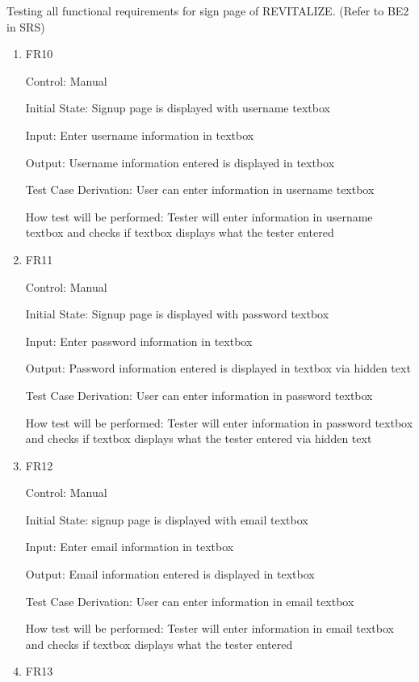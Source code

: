 \documentclass[12pt, titlepage]{article}
\begin{document}
Testing all functional requirements for sign page of REVITALIZE. (Refer to BE2 in SRS)

\begin{enumerate}

\item{FR10\\}

Control: Manual
					
Initial State: Signup page is displayed with username textbox
					
Input: Enter username information in textbox
					
Output: Username information entered is displayed in textbox

Test Case Derivation: User can enter information in username textbox

How test will be performed: Tester will enter information in username textbox and checks if textbox displays what the tester entered
					
\item{FR11\\}

Control: Manual
					
Initial State: Signup page is displayed with password textbox
					
Input: Enter password information in textbox
					
Output: Password information entered is displayed in textbox via hidden text

Test Case Derivation: User can enter information in password textbox

How test will be performed: Tester will enter information in password textbox and checks if textbox displays what the tester entered via hidden text

\item{FR12\\}

Control: Manual
					
Initial State: signup page is displayed with email textbox
					
Input: Enter email information in textbox
					
Output: Email information entered is displayed in textbox

Test Case Derivation: User can enter information in email textbox

How test will be performed: Tester will enter information in email textbox and checks if textbox displays what the tester entered

\item{FR13\\}


\end{enumerate}
\end{document}

